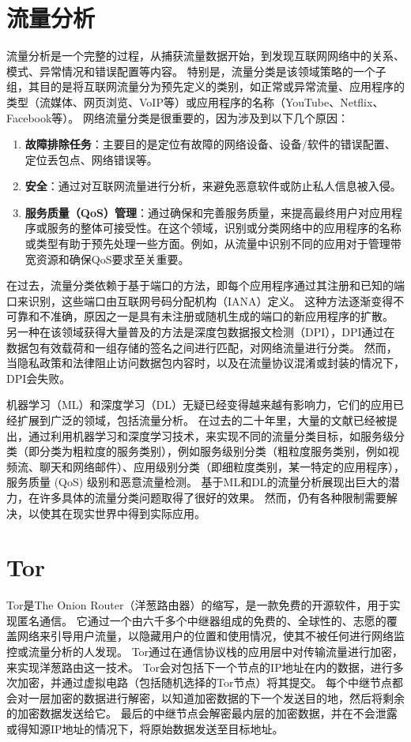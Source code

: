 \section{流量分析}
流量分析是一个完整的过程，从捕获流量数据开始，到发现互联网网络中的关系、模式、异常情况和错误配置等内容。
特别是，流量分类是该领域策略的一个子组，其目的是将互联网流量分为预先定义的类别，如正常或异常流量、应用程序的类型（流媒体、网页浏览、VoIP等）或应用程序的名称（YouTube、Netflix、Facebook等）。
网络流量分类是很重要的，因为涉及到以下几个原因：
\begin{enumerate}
  \item \textbf{故障排除任务}：主要目的是定位有故障的网络设备、设备/软件的错误配置、定位丢包点、网络错误等。 
  \item \textbf{安全}：通过对互联网流量进行分析，来避免恶意软件或防止私人信息被入侵。
  \item \textbf{服务质量（QoS）管理}：通过确保和完善服务质量，来提高最终用户对应用程序或服务的整体可接受性。在这个领域，识别或分类网络中的应用程序的名称或类型有助于预先处理一些方面。例如，从流量中识别不同的应用对于管理带宽资源和确保QoS要求至关重要。
\end{enumerate}

在过去，流量分类依赖于基于端口的方法，即每个应用程序通过其注册和已知的端口来识别，这些端口由互联网号码分配机构（IANA）定义。
这种方法逐渐变得不可靠和不准确，原因之一是具有未注册或随机生成的端口的新应用程序的扩散。
另一种在该领域获得大量普及的方法是深度包数据报文检测（DPI），DPI通过在数据包有效载荷和一组存储的签名之间进行匹配，对网络流量进行分类。
然而，当隐私政策和法律阻止访问数据包内容时，以及在流量协议混淆或封装的情况下，DPI会失败。

机器学习（ML）和深度学习（DL）无疑已经变得越来越有影响力，它们的应用已经扩展到广泛的领域，包括流量分析。
在过去的二十年里，大量的文献已经被提出，通过利用机器学习和深度学习技术，来实现不同的流量分类目标，如服务级分类（即分类为粗粒度的服务类别），例如服务级别分类（粗粒度服务类别，例如视频流、聊天和网络邮件）、应用级别分类（即细粒度类别，某一特定的应用程序），服务质量 (QoS) 级别和恶意流量检测。
基于ML和DL的流量分析展现出巨大的潜力，在许多具体的流量分类问题取得了很好的效果\cite{rezaei2019deep}。
然而，仍有各种限制需要解决，以使其在现实世界中得到实际应用。

\section{Tor}
Tor\cite{dingledine2004tor}是The Onion Router（洋葱路由器）的缩写，是一款免费的开源软件，用于实现匿名通信。
它通过一个由六千多个中继器组成的免费的、全球性的、志愿的覆盖网络来引导用户流量，以隐藏用户的位置和使用情况，使其不被任何进行网络监控或流量分析的人发现。
Tor通过在通信协议栈的应用层中对传输流量进行加密，来实现洋葱路由这一技术。
Tor会对包括下一个节点的IP地址在内的数据，进行多次加密，并通过虚拟电路（包括随机选择的Tor节点）将其提交。
每个中继节点都会对一层加密的数据进行解密，以知道加密数据的下一个发送目的地，然后将剩余的加密数据发送给它。
最后的中继节点会解密最内层的加密数据，并在不会泄露或得知源IP地址的情况下，将原始数据发送至目标地址。

